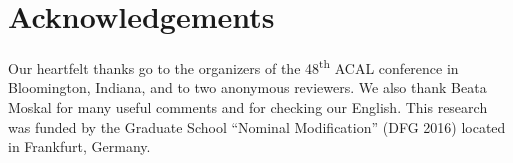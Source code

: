 \documentclass[output=paper]{langscibook}
\begin{document}
\section*{Acknowledgements}
\label{sec:traore:acknowledgements:6a}
Our heartfelt thanks go to the organizers of the 48\textsuperscript{th} ACAL conference in Bloomington, Indiana, and to two anonymous reviewers. We also thank Beata Moskal for many useful comments and for checking our English. This research was funded by the Graduate School ``Nominal Modification'' (DFG 2016) located in Frankfurt, Germany.

{\sloppy\printbibliography[heading=subbibliography,notkeyword=this]}
\end{document}
